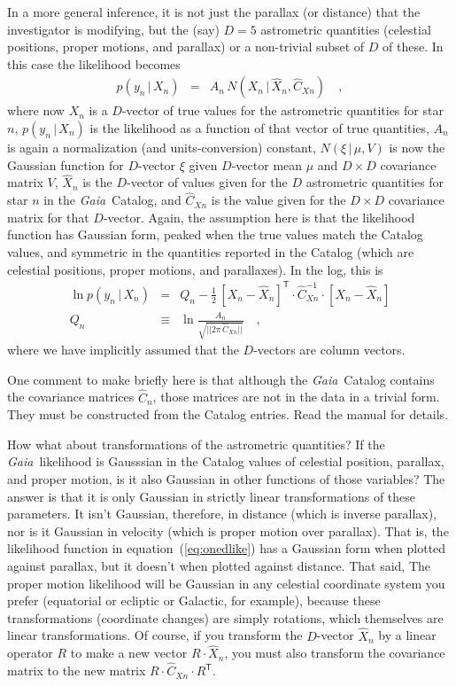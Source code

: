 \documentclass[12pt, modern]{aastex62h}
\newcommand{\Gaia}{\textsl{Gaia}}
\newcommand{\equationname}{equation}
\newcommand{\given}{\,|\,}
\newcommand{\T}{^{\mathsf{T}}}
\newcommand{\inv}{^{-1}}
\begin{document}
In a more general inference, it is not just the parallax (or distance)
that the investigator is modifying, but the (say) $D=5$ astrometric quantities
(celestial positions, proper motions, and parallax)
or a non-trivial subset of $D$ of these.
In this case the likelihood becomes
\begin{eqnarray}
p(y_n\given X_n) &=& A_n\,N(X_n\given\hat{X}_n,\hat{C}_{Xn})
\label{eq:like}
\quad ,
\end{eqnarray}
where now
$X_n$ is a $D$-vector of true values for the astrometric quantities for star $n$,
$p(y_n\given X_n)$ is the likelihood as a function of that vector of true quantities,
$A_n$ is again a normalization (and units-conversion) constant,
$N(\xi\given\mu,V)$ is now the Gaussian function for $D$-vector $\xi$ given $D$-vector mean $\mu$ and $D\times D$ covariance matrix $V$,
$\hat{X}_n$ is the $D$-vector of values given for the $D$ astrometric quantities for star $n$ in the \Gaia\ Catalog,
and $\hat{C}_{Xn}$ is the value given for the $D\times D$ covariance matrix for that
$D$-vector.
Again, the assumption here is that the likelihood function has Gaussian form, peaked
when the true values match the Catalog values, and symmetric in the quantities
reported in the Catalog (which are celestial positions, proper motions, and parallaxes).
In the log, this is
\begin{eqnarray}
\ln p(y_n\given X_n) &=& Q_n - \frac{1}{2}\,[X_n - \hat{X}_n]\T\cdot\hat{C}_{Xn}\inv\cdot [X_n - \hat{X}_n]
\\
Q_n &\equiv& \ln\frac{A_n}{\sqrt{||2\pi\,\hat{C}_{Xn}||}}
\quad ,
\end{eqnarray}
where we have implicitly assumed that the $D$-vectors are column vectors.

One comment to make briefly here is that although the \Gaia\ Catalog contains
the covariance matrices $\hat{C}_n$, those matrices are not in the data in a
trivial form.
They must be constructed from the Catalog entries.
Read the manual for details.

How what about transformations of the astrometric quantities?
If the \Gaia\ likelihood is Gausssian in the Catalog values of celestial position,
parallax, and proper motion, is it also Gaussian in other functions of those
variables?
The answer is that it is only Gaussian in strictly linear transformations
of these parameters.
It isn't Gaussian, therefore, in distance (which is inverse parallax), nor
is it Gaussian in velocity (which is proper motion over parallax).
That is, the likelihood function in \equationname~(\ref{eq:onedlike}) has a
Gaussian form when plotted against parallax, but it doesn't when plotted against
distance.
That said,
The proper motion likelihood will be Gaussian in any celestial coordinate
system you prefer (equatorial or ecliptic or Galactic, for example),
because these transformations (coordinate changes)
are simply rotations, which themselves are linear transformations.
Of course,
if you transform the $D$-vector $\hat{X}_n$ by a linear operator $R$ to make a new
vector $R\cdot\hat{X}_n$, you must also transform the covariance matrix to the new
matrix $R\cdot\hat{C}_{Xn}\cdot R\T$.
\end{document}
